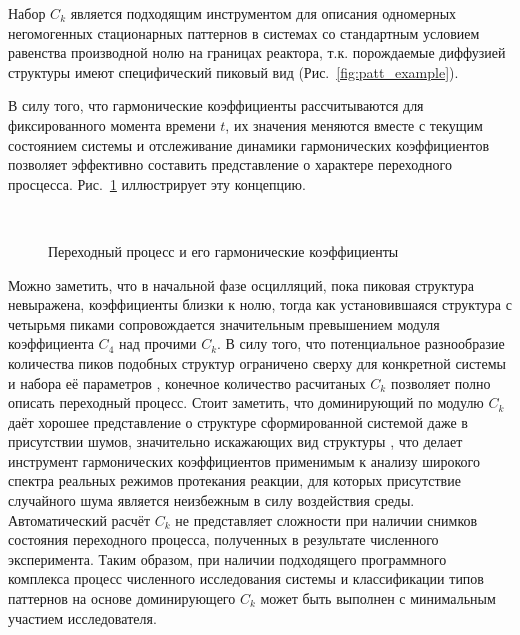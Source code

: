 Набор $C_k$ является подходящим инструментом для описания одномерных негомогенных стационарных паттернов в системах со стандартным условием равенства производной нолю на границах реактора, т.к. порождаемые диффузией структуры имеют специфический пиковый вид (Рис.~\ref{fig:patt_example}).

\begin{figure}[ht]
\end{figure}

В силу того, что гармонические коэффициенты рассчитываются для фиксированного момента времени $t$, их значения меняются вместе с текущим состоянием системы и отслеживание динамики гармонических коэффициентов позволяет эффективно составить представление о характере переходного просцесса. Рис.~\ref{fig:ck_intro} иллюстрирует эту концепцию. 

\begin{figure}[ht]
    \\
    \caption{Переходный процесс и его гармонические коэффициенты}\label{fig:ck_intro}
\end{figure}

Можно заметить, что в начальной фазе осцилляций, пока пиковая структура невыражена, коэффициенты близки к нолю, тогда как установившаяся структура с четырьмя пиками сопровождается значительным превышением модуля коэффициента $C_4$ над прочими $C_k$. В силу того, что потенциальное разнообразие количества пиков подобных структур ограничено сверху для конкретной системы и набора её параметров \cite{woolley2017turing}, конечное количество расчитаных $C_k$ позволяет полно описать переходный процесс. Стоит заметить, что доминирующий по модулю $C_k$ даёт хорошее представление о структуре сформированной системой даже в присутствии шумов, значительно искажающих вид структуры \cite{bib1}, что делает инструмент гармонических коэффициентов применимым к анализу широкого спектра реальных режимов протекания реакции, для которых присутствие случайного шума является неизбежным в силу воздействия среды. Автоматический расчёт $C_k$ не представляет сложности при наличии снимков состояния переходного процесса, полученных в результате численного эксперимента. Таким образом, при наличии подходящего программного комплекса \cite{progbib2} процесс численного исследования системы и классификации типов паттернов на основе доминирующего $C_k$ может быть выполнен с минимальным участием исследователя.

